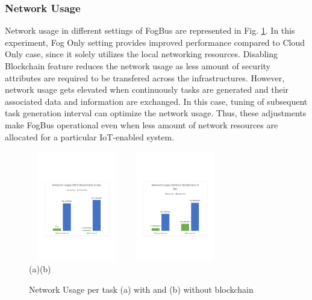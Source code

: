 \documentclass[final,5p,times,twocolumn]{elsarticle}
\begin{document}
\subsubsection{Network Usage}
%
Network usage in different settings of FogBus are represented in Fig. \ref{fig:netuse}. In this experiment, Fog Only setting provides improved performance compared to Cloud Only case, since it solely utilizes the local networking resources. Disabling Blockchain feature reduces the network usage as less amount of security attributes are required to be transfered across the infrastructures. However, network usage gets elevated when continuously tasks are generated and their associated data and information are exchanged. In this case, tuning of subsequent task generation interval can optimize the network usage. Thus, these adjustments make FogBus operational even when less amount of network resources are allocated for a particular IoT-enabled system.     
%
\begin{figure}[h]
	\begin{center}
	\centering
		\includegraphics[width=42mm, height=48mm]{NetUsage1}
		\hspace{5pt}
		\includegraphics[width=42mm, height=48mm]{NetUsage2}\\
        \footnotesize{(a)\hspace{120pt}(b)}\\		 
   	\caption{Network Usage per task (a) with and (b) without blockchain} \label{fig:netuse}
	\end{center}
\end{figure}
%
%
\end{document}
